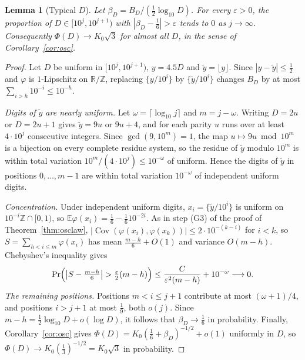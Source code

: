 \documentclass[11pt]{article}
\newtheorem{lemma}[theorem]{Lemma}
\theoremstyle{definition}
\theoremstyle{remark}
\begin{document}
\begin{lemma}[Typical $D$]\label{lem:typical}
Let $\beta_D=B_D/(\frac12\log_{10}D)$. For every $\varepsilon>0$, the
proportion of $D\in[10^j,10^{j+1})$ with $|\beta_D-\frac16|>\varepsilon$ tends
to $0$ as $j\to\infty$. Consequently $\Phi(D)\to K_0\sqrt3$ for almost all $D$,
in the sense of Corollary~\ref{cor:osc}.
\end{lemma}

\begin{proof}
Let $D$ be uniform in $[10^j,10^{j+1})$, $y=4.5D$ and $\tilde y=\lfloor y\rfloor$.
Since $|y-\tilde y|\le\frac12$ and $\varphi$ is $1$-Lipschitz on $\mathbb R/\mathbb Z$,
replacing $\{y/10^i\}$ by $\{\tilde y/10^i\}$ changes $B_D$ by at most
$\sum_{i>h}10^{-i}\le10^{-h}$.

\emph{Digits of $\tilde y$ are nearly uniform.} Let $\omega=\lceil\log_{10}j\rceil$
and $m=j-\omega$. Writing $D=2u$ or $D=2u+1$ gives $\tilde y=9u$ or $9u+4$, and
for each parity $u$ runs over at least $4\cdot10^j$ consecutive integers.
Since $\gcd(9,10^m)=1$, the map $u\mapsto9u\bmod10^m$ is a bijection on every
complete residue system, so the residue of $\tilde y$ modulo $10^m$ is within
total variation $10^m/(4\cdot10^j)\le10^{-\omega}$ of uniform. Hence the digits
of $\tilde y$ in positions $0,\dots,m-1$ are within total variation
$10^{-\omega}$ of independent uniform digits.

\emph{Concentration.} Under independent uniform digits, $x_i=\{\tilde y/10^i\}$
is uniform on $10^{-i}\mathbb Z\cap[0,1)$, so
$\mathbb E\varphi(x_i)=\frac16-\frac16 10^{-2i}$. As in step (G3) of the proof of
Theorem~\ref{thm:osclaw}, $|\operatorname{Cov}(\varphi(x_i),\varphi(x_k))|\le
2\cdot10^{-(k-i)}$ for $i<k$, so
$S=\sum_{h<i\le m}\varphi(x_i)$ has mean $\frac{m-h}6+O(1)$ and variance
$O(m-h)$. Chebyshev's inequality gives
\[
  \Pr\Bigl(\bigl|S-\tfrac{m-h}6\bigr|>\tfrac\varepsilon2(m-h)\Bigr)
  \le\frac{C}{\varepsilon^2(m-h)}+10^{-\omega}\longrightarrow0 .
\]
\emph{The remaining positions.} Positions $m<i\le j+1$ contribute at most
$(\omega+1)/4$, and positions $i>j+1$ at most $\frac19$, both $o(j)$. Since
$m-h=\frac12\log_{10}D+o(\log D)$, it follows that $\beta_D\to\frac16$ in
probability. Finally, Corollary~\ref{cor:osc} gives
$\Phi(D)=K_0(\frac16+\beta_D)^{-1/2}+o(1)$ uniformly in $D$, so
$\Phi(D)\to K_0(\frac13)^{-1/2}=K_0\sqrt3$ in probability.
\end{proof}
\end{document}

